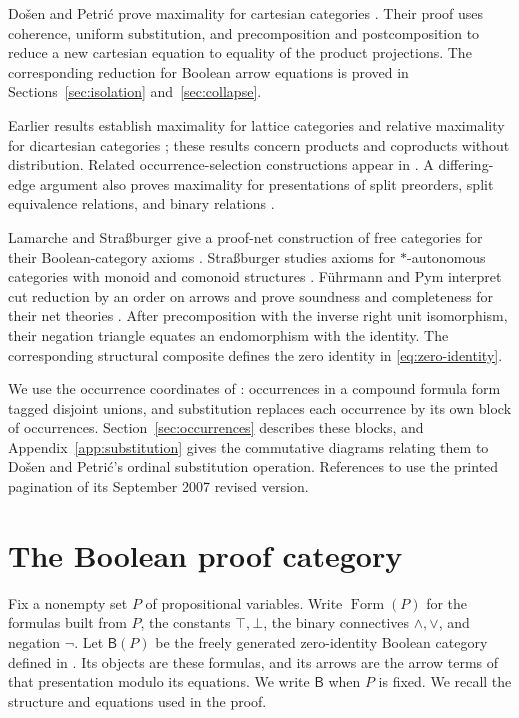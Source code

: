 \documentclass[11pt]{article}
\newcommand{\B}{\mathsf B}
\newcommand{\FormulaSet}{\operatorname{Form}}
\begin{document}
Do\v{s}en and Petri\'c prove maximality for cartesian categories
\cite[\S5]{DPCartesian}. Their proof uses coherence, uniform
substitution, and precomposition and postcomposition to reduce a new
cartesian equation to equality of the product projections. The
corresponding reduction for Boolean arrow equations is proved in
Sections~\ref{sec:isolation} and~\ref{sec:collapse}.

Earlier results establish maximality for lattice categories and relative
maximality for dicartesian categories
\cite[\S\S8--10]{DPBicartesian}; these results concern products and
coproducts without distribution. Related occurrence-selection
constructions appear in \cite[Lemma~6]{DPIsomorphic}. A differing-edge
argument also proves maximality for presentations of split preorders,
split equivalence relations, and binary relations \cite[\S16]{DPSplit}.

Lamarche and Stra{\ss}burger give a proof-net construction of free
categories for their Boolean-category axioms
\cite[Theorem~3.5.4]{LSFree}.
Stra{\ss}burger studies axioms for $*$-autonomous categories with
monoid and comonoid structures \cite{Strassburger}.
F\"uhrmann and Pym interpret cut reduction by an order on arrows and
prove soundness and completeness for their net theories
\cite[Theorems~6.4--6.5]{FP}.
After precomposition with the inverse right unit isomorphism, their
negation triangle \cite[(11), p.~28]{FP} equates an endomorphism with
the identity. The corresponding structural composite defines the
zero identity in \eqref{eq:zero-identity}.

We use the occurrence coordinates of \cite[\S9]{Notation}: occurrences
in a compound formula form tagged disjoint unions, and substitution
replaces each occurrence by its own block of occurrences.
Section~\ref{sec:occurrences} describes these blocks, and
Appendix~\ref{app:substitution} gives the commutative diagrams relating
them to Do\v{s}en and Petri\'c's ordinal substitution operation.
References to \cite{DP} use the printed pagination of its September
2007 revised version.

\section{The Boolean proof category}\label{sec:category}

Fix a nonempty set $P$ of propositional variables. Write $\FormulaSet(P)$
for the formulas built from $P$, the constants $\top,\bot$, the binary
connectives $\wedge,\vee$, and negation $\neg$. Let $\B(P)$ be the
freely generated zero-identity Boolean category defined in
\cite[\S\S14.2--14.3]{DP}. Its objects are these formulas, and its
arrows are the arrow terms of that presentation modulo its equations.
We write $\B$ when $P$ is fixed. We recall the structure and equations
used in the proof.
\end{document}
